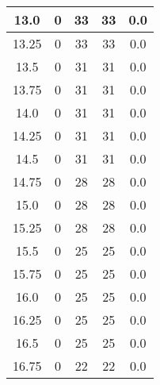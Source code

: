 \documentclass[letterpaper, 12pt]{article}
\begin{document}
\begin{longtable}{|c|c|c|c|c|}
\hline
13.0 & 0 & 33 & 33 & 0.0 \\
\hline
13.25 & 0 & 33 & 33 & 0.0 \\
\hline
13.5 & 0 & 31 & 31 & 0.0 \\
\hline
13.75 & 0 & 31 & 31 & 0.0 \\
\hline
14.0 & 0 & 31 & 31 & 0.0 \\
\hline
14.25 & 0 & 31 & 31 & 0.0 \\
\hline
14.5 & 0 & 31 & 31 & 0.0 \\
\hline
14.75 & 0 & 28 & 28 & 0.0 \\
\hline
15.0 & 0 & 28 & 28 & 0.0 \\
\hline
15.25 & 0 & 28 & 28 & 0.0 \\
\hline
15.5 & 0 & 25 & 25 & 0.0 \\
\hline
15.75 & 0 & 25 & 25 & 0.0 \\
\hline
16.0 & 0 & 25 & 25 & 0.0 \\
\hline
16.25 & 0 & 25 & 25 & 0.0 \\
\hline
16.5 & 0 & 25 & 25 & 0.0 \\
\hline
16.75 & 0 & 22 & 22 & 0.0 \\
\hline
\end{longtable}
\end{document}
